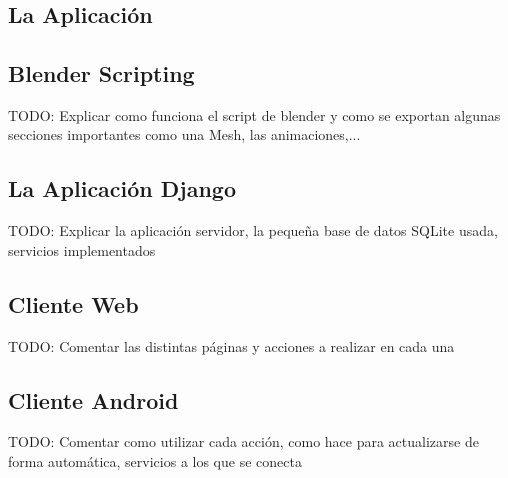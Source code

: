 
\chapter{\studio} %

\label{Chapter3} %



\section{La Aplicación \studio}

\section{Blender Scripting}
TODO: Explicar como funciona el script de blender y como se exportan algunas secciones importantes como una Mesh, las animaciones,...

\section{La Aplicación Django}
TODO: Explicar la aplicación servidor, la pequeña base de datos SQLite usada, servicios implementados

\section{Cliente Web}
TODO: Comentar las distintas páginas y acciones a realizar en cada una

\section{Cliente Android}
TODO: Comentar como utilizar cada acción, como hace para actualizarse de forma automática, servicios a los que se conecta